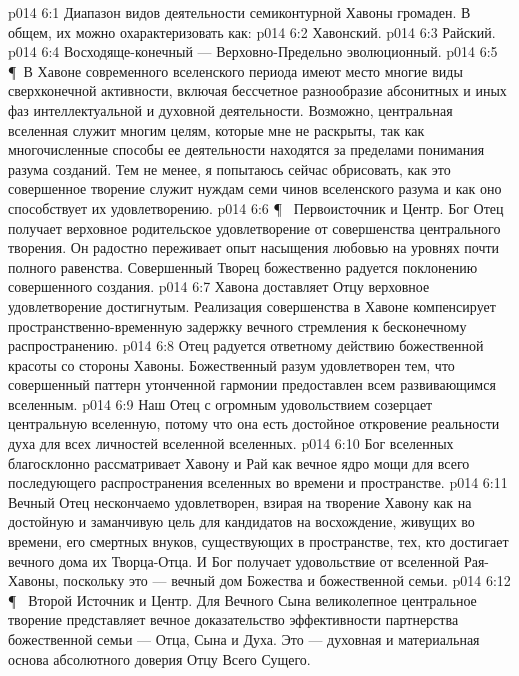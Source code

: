 \vs p014 6:1 Диапазон видов деятельности семиконтурной Хавоны громаден. В общем, их можно охарактеризовать как:
\vs p014 6:2 \bibnobreakspace Хавонский.
\vs p014 6:3 \bibnobreakspace Райский.
\vs p014 6:4 \bibnobreakspace Восходяще\hyp{}конечный --- Верховно\hyp{}Предельно эволюционный.
\vs p014 6:5 \P\ В Хавоне современного вселенского периода имеют место многие виды сверхконечной активности, включая бессчетное разнообразие абсонитных и иных фаз интеллектуальной и духовной деятельности. Возможно, центральная вселенная служит многим целям, которые мне не раскрыты, так как многочисленные способы ее деятельности находятся за пределами понимания разума созданий. Тем не менее, я попытаюсь сейчас обрисовать, как это совершенное творение служит нуждам семи чинов вселенского разума и как оно способствует их удовлетворению.
\vs p014 6:6 \P\ \bibnobreakspace {} Первоисточник и Центр. Бог Отец получает верховное родительское удовлетворение от совершенства центрального творения. Он радостно переживает опыт насыщения любовью на уровнях почти полного равенства. Совершенный Творец божественно радуется поклонению совершенного создания.
\vs p014 6:7 Хавона доставляет Отцу верховное удовлетворение достигнутым. Реализация совершенства в Хавоне компенсирует пространственно\hyp{}временную задержку вечного стремления к бесконечному распространению.
\vs p014 6:8 Отец радуется ответному действию божественной красоты со стороны Хавоны. Божественный разум удовлетворен тем, что совершенный паттерн утонченной гармонии предоставлен всем развивающимся вселенным.
\vs p014 6:9 Наш Отец с огромным удовольствием созерцает центральную вселенную, потому что она есть достойное откровение реальности духа для всех личностей вселенной вселенных.
\vs p014 6:10 Бог вселенных благосклонно рассматривает Хавону и Рай как вечное ядро мощи для всего последующего распространения вселенных во времени и пространстве.
\vs p014 6:11 Вечный Отец нескончаемо удовлетворен, взирая на творение Хавону как на достойную и заманчивую цель для кандидатов на восхождение, живущих во времени, его смертных внуков, существующих в пространстве, тех, кто достигает вечного дома их Творца\hyp{}Отца. И Бог получает удовольствие от вселенной Рая\hyp{}Хавоны, поскольку это --- вечный дом Божества и божественной семьи.
\vs p014 6:12 \P\ \bibnobreakspace {} Второй Источник и Центр. Для Вечного Сына великолепное центральное творение представляет вечное доказательство эффективности партнерства божественной семьи --- Отца, Сына и Духа. Это --- духовная и материальная основа абсолютного доверия Отцу Всего Сущего.
